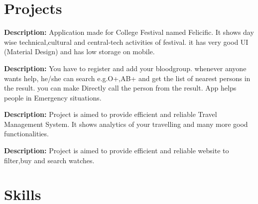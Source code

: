 \documentclass[]{denish-resume-openfont}
\begin{document}
\begin{minipage}[t]{0.69\textwidth}


\section{Projects}



\textbf{Description:}  Application made for College Festival named Felicific. It shows day wise technical,cultural and central-tech activities of festival. it has very good UI (Material Design) and has low storage on mobile.\\
\sectionsep


\textbf{Description:} You have to register and add your bloodgroup. whenever anyone wants help, he/she can search e.g.O+,AB+ and get the list of nearest persons in the result. you can make Directly call the person from the result. App helps people in Emergency situations. \\
\sectionsep

\textbf{Description:} Project is aimed to provide efficient and reliable Travel Management System. It shows analytics of your travelling and many more good functionalities.\\
\sectionsep

\textbf{Description:} Project is aimed to provide efficient and reliable website to filter,buy and search watches.\\
\sectionsep



\section{Skills}


\end{minipage}
\end{document}

